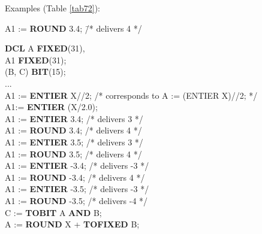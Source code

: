 Examples (Table \ref{tab72}):
\begin{modified}
\begin{tabbing}
A1 := {\bf ROUND} 3.4; \x \x \=  /* delivers 4 */ \kill 

{\bf DCL} A {\bf FIXED}(31),\\
\x A1 {\bf FIXED}(31);\\
\x (B, C) {\bf BIT}(15);\\
...\\
A1 := {\bf ENTIER} X//2; \> /* corresponds to A := (ENTIER X)//2; */ \\
A1:= {\bf ENTIER} (X/2.0);\\
A1 := {\bf ENTIER} 3.4; \> /* delivers 3 */ \\
A1 := {\bf ROUND} 3.4;  \>  /* delivers 4 */ \\
A1 := {\bf ENTIER} 3.5; \> /* delivers 3 */ \\
A1 := {\bf ROUND} 3.5;  \>  /* delivers 4 */ \\
A1 := {\bf ENTIER} -3.4; \> /* delivers -3 */ \\
A1 := {\bf ROUND} -3.4; \> /* delivers 4 */ \\
A1 := {\bf ENTIER} -3.5; \> /* delivers -3 */ \\
A1 := {\bf ROUND} -3.5; \> /* delivers -4 */ \\
C := {\bf TOBIT} A {\bf AND} B;\\
A := {\bf ROUND} X + {\bf TOFIXED} B;
\end{tabbing}
\end{modified}


